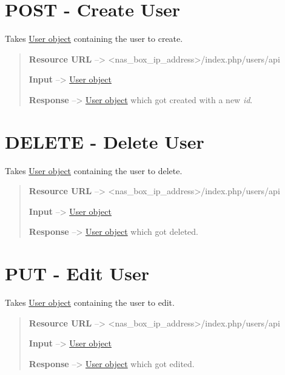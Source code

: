 \documentclass[letterpaper,10pt,english]{sphinxmanual}
\begin{document}
\section{POST - Create User}
\label{usersgroups:post-create-user}
Takes {\hyperref[usersgroups:user-object-label]{User object}} containing the user to create.
\begin{quote}

\textbf{Resource URL} --\textgreater{} \textless{}nas\_box\_ip\_address\textgreater{}/index.php/users/api

\textbf{Input} --\textgreater{} {\hyperref[usersgroups:user-object-label]{User object}}

\textbf{Response} --\textgreater{} {\hyperref[usersgroups:user-object-label]{User object}} which got created with a new \emph{id}.
\end{quote}


\section{DELETE - Delete User}
\label{usersgroups:delete-delete-user}
Takes {\hyperref[usersgroups:user-object-label]{User object}} containing the user to delete.
\begin{quote}

\textbf{Resource URL} --\textgreater{} \textless{}nas\_box\_ip\_address\textgreater{}/index.php/users/api

\textbf{Input} --\textgreater{} {\hyperref[usersgroups:user-object-label]{User object}}

\textbf{Response} --\textgreater{} {\hyperref[usersgroups:user-object-label]{User object}} which got deleted.
\end{quote}


\section{PUT - Edit User}
\label{usersgroups:put-edit-user}
Takes {\hyperref[usersgroups:user-object-label]{User object}} containing the user to edit.
\begin{quote}

\textbf{Resource URL} --\textgreater{} \textless{}nas\_box\_ip\_address\textgreater{}/index.php/users/api

\textbf{Input} --\textgreater{} {\hyperref[usersgroups:user-object-label]{User object}}

\textbf{Response} --\textgreater{} {\hyperref[usersgroups:user-object-label]{User object}} which got edited.
\end{quote}
\end{document}
